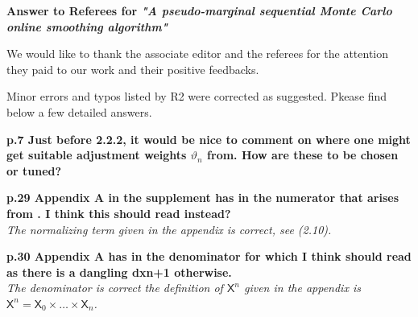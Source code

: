 \documentclass[12pt]{amsart}
\begin{document}
\begin{center}
\textbf{Answer to Referees for \textit{"A pseudo-marginal sequential Monte Carlo online smoothing algorithm"}}
\end{center}

\bigskip

We would like to thank the associate editor and the referees for the attention they paid to our work and their positive feedbacks. 

\bigskip

Minor errors and typos listed by R2 were corrected as suggested. Pkease find below a few detailed answers.

\medskip

{\bf p.7 Just before 2.2.2, it would be nice to comment on where one might get suitable adjustment weights $\vartheta_n$ from. How are these to be chosen or tuned?}\\
{\em }

\medskip

{\bf p.29 Appendix A in the supplement has in the numerator that arises from . I think this should read instead?}\\
{\em The normalizing term given in the appendix is correct, see (2.10).}

\medskip

{\bf p.30 Appendix A has in the denominator for  which I think should read  as there is a dangling dxn+1 otherwise.}\\
{\em The denominator is correct the definition of $\mathsf{X}^n$ given in the appendix is $\mathsf{X}^n = \mathsf{X}_0 \times \ldots \times  \mathsf{X}_n$.}

\medskip
\end{document}
